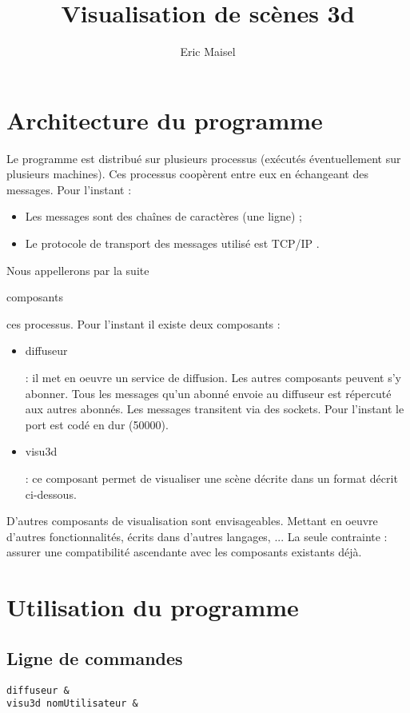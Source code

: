 \documentclass{article}
\title{Visualisation de scènes 3d}
\author{Eric Maisel}
\date{}
\begin{document}
\maketitle


\section{Architecture du programme}
Le programme est distribué sur plusieurs processus (exécutés éventuellement sur plusieurs machines).
Ces processus coopèrent entre eux en échangeant des messages. Pour l'instant : 
\begin{itemize}
\item Les messages sont des chaînes de caractères (une ligne) ;
\item Le protocole de transport des messages utilisé est TCP/IP .
\end{itemize}
Nous appellerons par la suite \begin{bf}composants\end{bf} ces processus. Pour l'instant il existe deux composants : 
\begin{itemize}
\item \begin{tt}diffuseur\end{tt} : il met en oeuvre un service de diffusion. Les autres composants peuvent s'y abonner.
Tous les messages qu'un abonné envoie au diffuseur est répercuté aux autres abonnés. Les messages transitent via des sockets. Pour l'instant le port est codé en dur (50000).

\item \begin{tt}visu3d\end{tt} : ce composant permet de visualiser une scène décrite dans un format décrit ci-dessous.

\end{itemize}
%
D'autres composants de visualisation sont envisageables. Mettant en oeuvre d'autres fonctionnalités, écrits dans d'autres langages, ... La seule contrainte : assurer une compatibilité ascendante avec les composants existants déjà.


\section{Utilisation du programme}

\subsection{Ligne de commandes}
\begin{verbatim}
diffuseur &
visu3d nomUtilisateur &
\end{verbatim}
\end{document}
